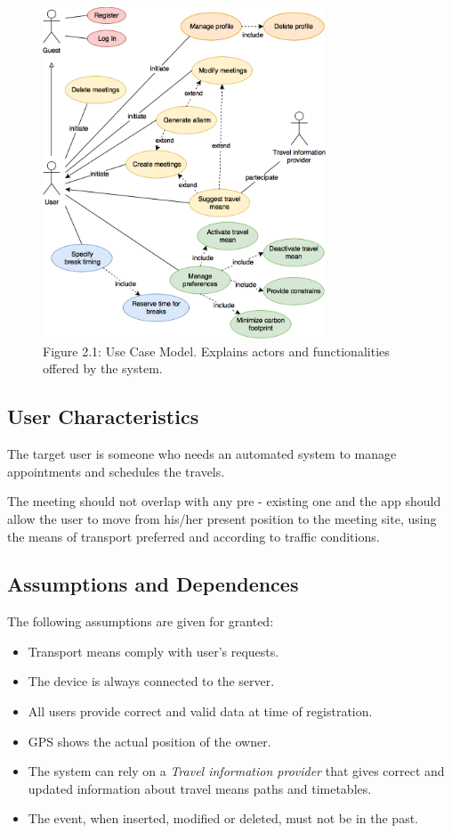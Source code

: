 \documentclass{article}
\begin{document}
	\bigskip
	\bigskip
	\begin{figure}[htbp]
		\begin{center}
		\includegraphics[width=0.75\textwidth]{img/diagrams/uc.png} \\ \bigskip
		Figure 2.1: Use Case Model. Explains actors and functionalities offered by the system.
		\label{default}
		\end{center}
	\end{figure}
	
	
	\subsection{User Characteristics}
	The target user is someone who needs an automated system to manage appointments and schedules the travels.

	The meeting should not overlap with any pre - existing one and the app should allow the user to move from his/her present position to the meeting site, using the means of transport preferred and according to traffic conditions. 
	
	
	\subsection{Assumptions and Dependences}
	The following assumptions are given for granted:
	\begin{itemize}
		\item  Transport means comply with user’s requests.
		\item  The device is always connected to the server.
		\item  All users provide correct and valid data at time of registration.
		\item  GPS shows the actual position of the owner.
		\item  The system can rely on a \textit{Travel information provider} that gives correct and updated information about travel means paths and timetables.
		\item  The event, when inserted, modified or deleted, must not be in the past.
	\end{itemize}
	
\end{document}
